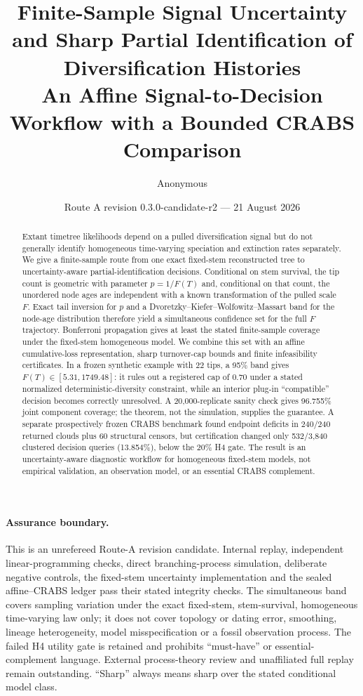 \documentclass[11pt]{article}
\title{\textbf{Finite-Sample Signal Uncertainty and Sharp Partial Identification of Diversification Histories}\\
\large An Affine Signal-to-Decision Workflow with a Bounded CRABS Comparison}
\author{Anonymous}
\date{Route A revision 0.3.0-candidate-r2 --- 21 August 2026}
\theoremstyle{definition}
\begin{document}
\maketitle

\begin{abstract}
Extant timetree likelihoods depend on a pulled diversification signal but do not generally identify homogeneous time-varying speciation and extinction rates separately. We give a finite-sample route from one exact fixed-stem reconstructed tree to uncertainty-aware partial-identification decisions. Conditional on stem survival, the tip count is geometric with parameter $p=1/F(T)$ and, conditional on that count, the unordered node ages are independent with a known transformation of the pulled scale $F$. Exact tail inversion for $p$ and a Dvoretzky--Kiefer--Wolfowitz--Massart band for the node-age distribution therefore yield a simultaneous confidence set for the full $F$ trajectory. Bonferroni propagation gives at least the stated finite-sample coverage under the fixed-stem homogeneous model. We combine this set with an affine cumulative-loss representation, sharp turnover-cap bounds and finite infeasibility certificates. In a frozen synthetic example with 22 tips, a 95\% band gives $F(T)\in[5.31,1749.48]$: it rules out a registered cap of 0.70 under a stated normalized deterministic-diversity constraint, while an interior plug-in ``compatible'' decision becomes correctly unresolved. A 20,000-replicate sanity check gives 96.755\% joint component coverage; the theorem, not the simulation, supplies the guarantee. A separate prospectively frozen CRABS benchmark found endpoint deficits in 240/240 returned clouds plus 60 structural censors, but certification changed only 532/3,840 clustered decision queries (13.854\%), below the 20\% H4 gate. The result is an uncertainty-aware diagnostic workflow for homogeneous fixed-stem models, not empirical validation, an observation model, or an essential CRABS complement.
\end{abstract}

\paragraph{Assurance boundary.}
This is an unrefereed Route-A revision candidate. Internal replay, independent linear-programming checks, direct branching-process simulation, deliberate negative controls, the fixed-stem uncertainty implementation and the sealed affine--CRABS ledger pass their stated integrity checks. The simultaneous band covers sampling variation under the exact fixed-stem, stem-survival, homogeneous time-varying law only; it does not cover topology or dating error, smoothing, lineage heterogeneity, model misspecification or a fossil observation process. The failed H4 utility gate is retained and prohibits ``must-have'' or essential-complement language. External process-theory review and unaffiliated full replay remain outstanding. ``Sharp'' always means sharp over the stated conditional model class.
\end{document}
